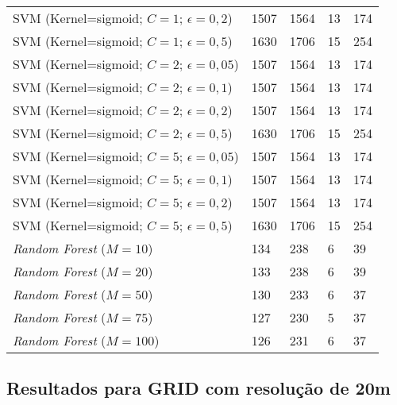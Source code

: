 \begin{center}
\begin{longtable}{|l|l|l|l|l|}
SVM (Kernel=sigmoid; $C=1$; $\epsilon=0,2$) & 1507 & 1564 & 13 & 174 \\
SVM (Kernel=sigmoid; $C=1$; $\epsilon=0,5$) & 1630 & 1706 & 15 & 254 \\
SVM (Kernel=sigmoid; $C=2$; $\epsilon=0,05$) & 1507 & 1564 & 13 & 174 \\
SVM (Kernel=sigmoid; $C=2$; $\epsilon=0,1$) & 1507 & 1564 & 13 & 174 \\
SVM (Kernel=sigmoid; $C=2$; $\epsilon=0,2$) & 1507 & 1564 & 13 & 174 \\
SVM (Kernel=sigmoid; $C=2$; $\epsilon=0,5$) & 1630 & 1706 & 15 & 254 \\
SVM (Kernel=sigmoid; $C=5$; $\epsilon=0,05$) & 1507 & 1564 & 13 & 174 \\
SVM (Kernel=sigmoid; $C=5$; $\epsilon=0,1$) & 1507 & 1564 & 13 & 174 \\
SVM (Kernel=sigmoid; $C=5$; $\epsilon=0,2$) & 1507 & 1564 & 13 & 174 \\
SVM (Kernel=sigmoid; $C=5$; $\epsilon=0,5$) & 1630 & 1706 & 15 & 254 \\
\textit{Random Forest} ($M=10$) & 134 & 238 & 6 & 39 \\
\textit{Random Forest} ($M=20$) & 133 & 238 & 6 & 39 \\
\textit{Random Forest} ($M=50$) & 130 & 233 & 6 & 37 \\
\textit{Random Forest} ($M=75$) & 127 & 230 & 5 & 37 \\
\textit{Random Forest} ($M=100$) & 126 & 231 & 6 & 37 \\
\end{longtable}
\end{center}


\subsection{Resultados para GRID com resolução de 20m}
\label{appendix:fulltable20m}

